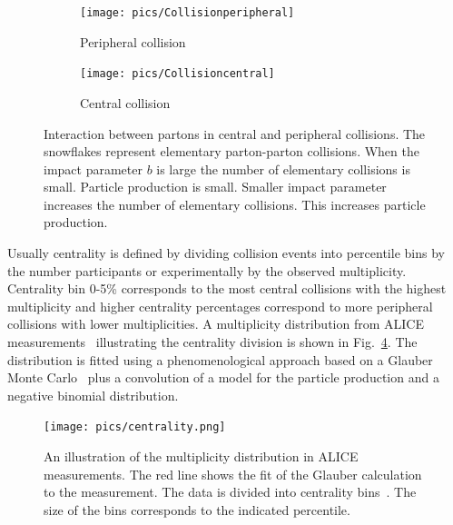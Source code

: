 \begin{figure}[h!]
\centering
        \begin{subfigure}[b]{0.45\textwidth}
                \centering
            	\texttt{[image: pics/Collisionperipheral]}
                \caption{Peripheral collision}
                \label{fig:peripheral}
        \end{subfigure}
        \begin{subfigure}[b]{0.45\textwidth}
                \centering
               \texttt{[image: pics/Collisioncentral]}
                \caption{Central collision}
                \label{fig:central}
        \end{subfigure}
        \caption[Interaction between partons in central and peripheral collisions.]{Interaction between partons in central and peripheral collisions. The snowflakes represent elementary parton-parton collisions. When the impact parameter $b$ is large the number of elementary collisions is small. Particle production is small. Smaller impact parameter increases the number of elementary collisions. This increases  particle production.}\label{fig:collisionA}
\end{figure}

Usually centrality is defined by dividing collision events into percentile bins by the number participants or experimentally by the observed multiplicity. Centrality bin 0-5\% corresponds to the most central collisions with the highest multiplicity and higher centrality percentages correspond to more peripheral collisions with lower multiplicities. A multiplicity distribution from ALICE measurements~\cite{PhysRevC.88.044909} illustrating the centrality division is shown in Fig.~\ref{fig:centrality}. The distribution is fitted using a phenomenological approach based on a Glauber Monte Carlo~\cite{Miller:2007ri} plus a convolution of a model for the particle production and a negative binomial distribution. 


\begin{figure}[htb]
\centering

               \texttt{[image: pics/centrality.png]}
        \caption[An illustration of the multiplicity distribution in ALICE measurement with centrality classes.]{An illustration of the multiplicity distribution in ALICE measurements. The red line shows
the fit of the Glauber calculation to the measurement. The data is divided into centrality bins~\cite{PhysRevC.88.044909}. The size of the bins corresponds to the indicated percentile.}
        	\label{fig:centrality}
\end{figure}

